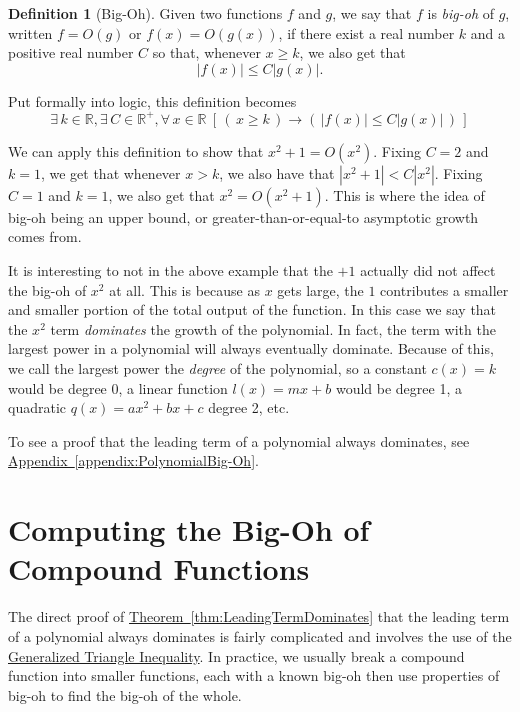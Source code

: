 \documentclass[11pt,oneside]{book}
\theoremstyle{definition}
\newtheorem{defn}[thm]{Definition}
\begin{document}
\begin{defn}[Big-Oh] \label{defn:Big-Oh}
    Given two functions $f$ and $g$, we say that $f$ is \emph{big-oh} of $g$, written $f = O(g)$ or $f(x) = O(g(x))$, if there exist a real number $k$ and a positive real number $C$ so that, whenever $x \geq k$, we also get that
    \[ |f(x)| \leq C|g(x)|. \]
\end{defn}

Put formally into logic, this definition becomes
\begin{equation} \exists\, k \in \mathbb{R}, \exists\, C \in \mathbb{R}^{+}, \forall\, x \in \mathbb{R}\ [\, (\, x \geq k\, ) \rightarrow (\, |f(x)| \leq C|g(x)|\, )\, ] \label{eq:Big-Oh} \end{equation}

We can apply this definition to show that $x^{2} + 1 = O(x^{2})$.
Fixing $C = 2$ and $k = 1$, we get that whenever $x > k$, we also have that $|x^{2} + 1| < C|x^{2}|$.
Fixing $C = 1$ and $k = 1$, we also get that $x^{2} = O(x^{2} + 1)$.
This is where the idea of big-oh being an upper bound, or greater-than-or-equal-to asymptotic growth comes from.

It is interesting to not in the above example that the $+1$ actually did not affect the big-oh of $x^{2}$ at all.
This is because as $x$ gets large, the $1$ contributes a smaller and smaller portion of the total output of the function.
In this case we say that the $x^{2}$ term \emph{dominates} the growth of the polynomial.
In fact, the term with the largest power in a polynomial will always eventually dominate.
Because of this, we call the largest power the \emph{degree} of the polynomial, so a constant $c(x) = k$ would be degree 0, a linear function $l(x) = mx + b$ would be degree 1, a quadratic $q(x) = ax^{2} + bx + c$ degree 2, etc.

To see a proof that the leading term of a polynomial always dominates, see \hyperref[appendix:PolynomialBig-Oh]{Appendix~\ref*{appendix:PolynomialBig-Oh}}.



\section{Computing the Big-Oh of Compound Functions}
The direct proof of \hyperref[thm:LeadingTermDominates]{Theorem~\ref*{thm:LeadingTermDominates}} that the leading term of a polynomial always dominates is fairly complicated and involves the use of the \hyperref[lem:GeneralizedTriangleInequality]{Generalized Triangle Inequality}.
In practice, we usually break a compound function into smaller functions, each with a known big-oh then use properties of big-oh to find the big-oh of the whole.
\end{document}
